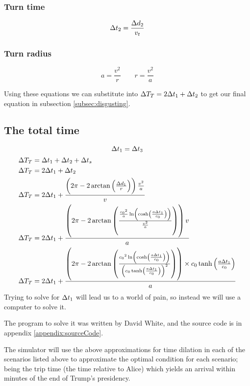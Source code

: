 \begin{samepagecols}{2}
			\subsubsection{Turn time}
				\begin{equation*}
					\mathrm{\Delta} t_2 = \frac{\mathrm{\Delta} d_2}{v_t}
				\end{equation*}
			\subsubsection{Turn radius}
				\begin{equation*}
					a = \frac{v^2}{r} \qquad r = \frac{v^2}{a}
				\end{equation*}
		\end{samepagecols}
		Using these equations we can substitute into $\mathrm{\Delta} T_T = 2\mathrm{\Delta} t_1 + \mathrm{\Delta} t_2$ to get our final equation in subsection \vref{subsec:disgusting}.
	\subsection{The total time}\label{subsec:disgusting}
		\[\mathrm{\Delta} t_1 = \mathrm{\Delta} t_3\]
		\begin{align*}
			\Del T_T &= \Del t_1 + \Del t_2 + \Del t_s\\
			\Del T_T &= 2\Del t_1 + \Del t_2\\
			\Del T_T &= 2\Del t_1 + \frac{\left(2\pi - 2\arctan\left(\frac{\Del d_1}{r}\right)\right) \frac{v^2}{a}}{v}\\
			\Del T_T &= 2\Del t_1+\frac{\left(2\pi - 2\arctan\left(\frac{\frac{\si{\clight}^2}{a}\ln\left(\cosh\left(\frac{a\Del t_1}{\si{\clight}}\right)\right)}{\frac{v^2}{a}}\right)\right) v}{a}\\
			\Del T_T &= 2\Del t_1+\frac{\left(2\pi-2\arctan\left(\frac{\si{\clight}^2\ln\left(\cosh\left(\frac{a\Del t_1}{\si{\clight}}\right)\right)}{\left(\si{\clight}\tanh\left(\frac{a\Del t_1}{\si{\clight}}\right)\right)^2}\right)\right) \times \si{\clight}\tanh\left(\frac{a\Del t_1}{\si{\clight}}\right)}{a}
		\end{align*}
		Trying to solve for $\mathrm{\Delta} t_1$ will lead us to a world of pain, so instead we will use a computer to solve it.

		The program to solve it was written by David White, and the source code is in appendix \vref{appendix:sourceCode}.

		The simulator will use the above approximations for time dilation in each of the scenarios listed above to approximate the optimal
		condition for each scenario; being the trip time (the time relative to Alice) which yields an arrival within minutes of the
		end of Trump's presidency.


